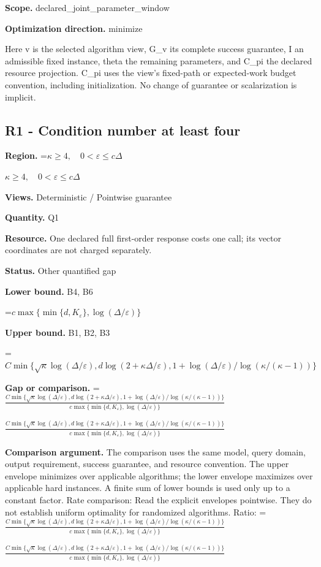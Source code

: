 \documentclass[10pt,a4paper]{article}
\newcommand{\AtlasMath}[1]{\par\begingroup\centering\setbox0=\hbox{$\displaystyle #1$}\ifdim\wd0>1.4\linewidth\typeout{ATLAS WIDE FORMULA: \the\wd0}\fi\ifdim\wd0>\linewidth\resizebox{\linewidth}{!}{\box0}\else\box0\fi\par\endgroup}
\newcommand{\AtlasInlineMath}[1]{\begingroup\setbox0=\hbox{$#1$}\ifdim\wd0>.4\linewidth\endgroup\AtlasMath{#1}\else\endgroup$#1$\fi}
\begin{document}
\textbf{Scope.} declared\_joint\_parameter\_window

\textbf{Optimization direction.} minimize

Here v is the selected algorithm view, G\_v its complete success guarantee, I an admissible fixed instance, theta the remaining parameters, and C\_pi the declared resource projection. C\_pi uses the view's fixed-path or expected-work budget convention, including initialization. No change of guarantee or scalarization is implicit.

\subsection{R1 - Condition number at least four}
\textbf{Region.} \AtlasInlineMath{\kappa\ge4,\quad0<\varepsilon\le c\Delta}

\textbf{Views.} Deterministic / Pointwise guarantee

\textbf{Quantity.} Q1

\textbf{Resource.} One declared full first-order response costs one call; its vector coordinates are not charged separately.

\textbf{Status.} Other quantified gap

\textbf{Lower bound.} B4, B6

\AtlasMath{c\max\{\min\{d,K_\varepsilon\},\log(\Delta/\varepsilon)\}}
\textbf{Upper bound.} B1, B2, B3

\AtlasMath{C\min\{\sqrt\kappa\log(\Delta/\varepsilon),d\log(2+\kappa\Delta/\varepsilon),1+\log(\Delta/\varepsilon)/\log(\kappa/(\kappa-1))\}}
\textbf{Gap or comparison.} \AtlasInlineMath{\frac{C\min\{\sqrt\kappa\log(\Delta/\varepsilon),d\log(2+\kappa\Delta/\varepsilon),1+\log(\Delta/\varepsilon)/\log(\kappa/(\kappa-1))\}}{c\max\{\min\{d,K_\varepsilon\},\log(\Delta/\varepsilon)\}}}

\textbf{Comparison argument.} The comparison uses the same model, query domain, output requirement, success guarantee, and resource convention. The upper envelope minimizes over applicable algorithms; the lower envelope maximizes over applicable hard instances. A finite sum of lower bounds is used only up to a constant factor. Rate comparison: Read the explicit envelopes pointwise. They do not establish uniform optimality for randomized algorithms. Ratio: \AtlasInlineMath{\frac{C\min\{\sqrt\kappa\log(\Delta/\varepsilon),d\log(2+\kappa\Delta/\varepsilon),1+\log(\Delta/\varepsilon)/\log(\kappa/(\kappa-1))\}}{c\max\{\min\{d,K_\varepsilon\},\log(\Delta/\varepsilon)\}}}
\end{document}
